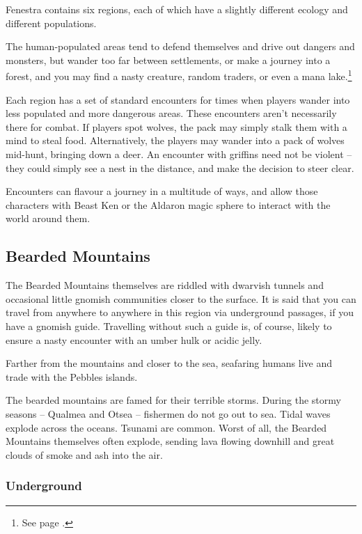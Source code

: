 \begin{multicols}{2}

Fenestra contains six regions, each of which have a slightly different ecology and different populations.

The human-populated areas tend to defend themselves and drive out dangers and monsters, but wander too far between settlements, or make a journey into a forest, and you may find a nasty creature, random traders, or even a mana lake.\footnote{See page \pageref{mana_lake}.}

Each region has a set of standard encounters for times when players wander into less populated and more dangerous areas.  These encounters aren't necessarily there for combat.  If players spot wolves, the pack may simply stalk them with a mind to steal food.  Alternatively, the players may wander into a pack of wolves mid-hunt, bringing down a deer.  An encounter with griffins need not be violent -- they could simply see a nest in the distance, and make the decision to steer clear.

Encounters can flavour a journey in a multitude of ways, and allow those characters with Beast Ken or the Aldaron magic sphere to interact with the world around them.

\subsection{Bearded Mountains}

The Bearded Mountains themselves are riddled with dwarvish tunnels and occasional little gnomish communities closer to the surface.  It is said that you can travel from anywhere to anywhere in this region via underground passages, if you have a gnomish guide.  Travelling without such a guide is, of course, likely to ensure a nasty encounter with an umber hulk or acidic jelly.

Farther from the mountains and closer to the sea, seafaring humans live and trade with the Pebbles islands.

The bearded mountains are famed for their terrible storms.  During the stormy seasons -- Qualmea and Otsea -- fishermen do not go out to sea.  Tidal waves explode across the oceans.  Tsunami are common.  Worst of all, the Bearded Mountains themselves often explode, sending lava flowing downhill and great clouds of smoke and ash into the air.

\subsubsection{Underground}


\end{multicols}
